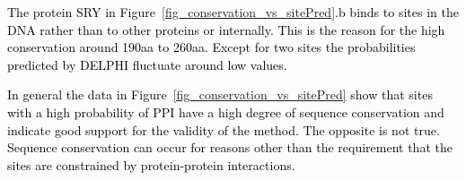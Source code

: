\documentclass{bioinfo}
\newcommand{\mySecondColor}{black}
\begin{document}
\textcolor{\mySecondColor}{The protein SRY in Figure~\ref{fig_conservation_vs_sitePred}.b binds to sites in the DNA rather
than to other proteins or internally.  This is the reason for the
high conservation around 190aa to 260aa.  Except for two sites the
probabilities predicted by DELPHI fluctuate around low values.}

\textcolor{\mySecondColor}{In general the data in Figure~\ref{fig_conservation_vs_sitePred} show that sites with a high probability
of PPI have a high degree of sequence conservation and indicate good
support for the validity of the method.  The opposite is not true.
Sequence conservation can occur for reasons other than the requirement
that the sites are constrained by protein-protein interactions.}



% 
% 
% 
% 
% 
% 
% 
%
\end{document}
